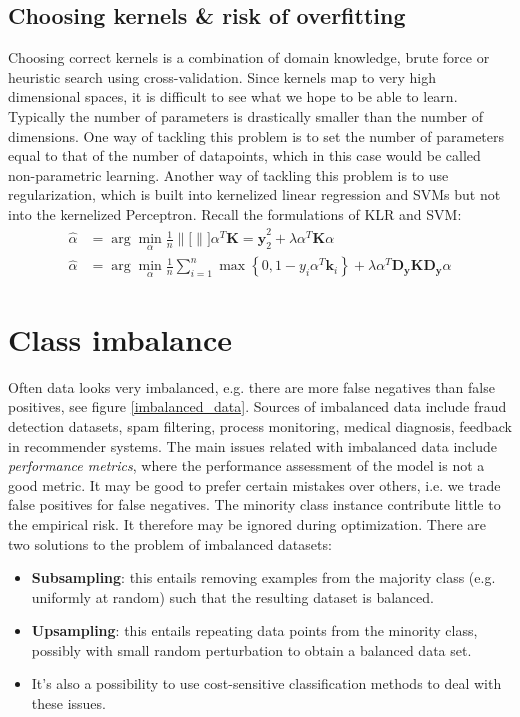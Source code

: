 \documentclass[a4paper,10pt,twoside]{article}
\newcommand\norm[1]{\left\lVert#1\right\rVert}
\begin{document}
\subsection{Choosing kernels \& risk of overfitting}

Choosing correct kernels is a combination of domain knowledge, brute force or heuristic search using cross-validation. Since kernels map to very high dimensional spaces, it is difficult to see what we hope to be able to learn. Typically the number of parameters is drastically smaller than the number of dimensions. One way of tackling this problem is to set the number of parameters equal to that of the number of datapoints, which in this case would be called non-parametric learning. Another way of tackling this problem is to use regularization, which is built into kernelized linear regression and SVMs but not into the kernelized Perceptron. Recall the formulations of KLR and SVM:
\begin{align*}
    \hat{\alpha} &= \arg\min_{\alpha}\frac{1}{n}\norm[]{\alpha^T\mathbf{K}=\mathbf{y}}_2^2+\lambda\alpha^T\mathbf{K}\alpha\\
    \hat{\alpha} &= \arg\min_{\alpha}\frac{1}{n}\sum_{i=1}^{n}\max\left\{0,1-y_i\alpha^T\mathbf{k}_i\right\} + \lambda\alpha^T\mathbf{D}_{\mathbf{y}}\mathbf{K}\mathbf{D}_\mathbf{y}\alpha
\end{align*}

\section{Class imbalance}

Often data looks very imbalanced, e.g. there are more false negatives than false positives, see figure \ref{imbalanced_data}. Sources of imbalanced data include fraud detection datasets, spam filtering, process monitoring, medical diagnosis, feedback in recommender systems. The main issues related with imbalanced data include \textit{performance metrics}, where the performance assessment of the model is not a good metric. It may be good to prefer certain mistakes over others, i.e. we trade false positives for false negatives. The minority class instance contribute little to the empirical risk. It therefore may be ignored during optimization. There are two solutions to the problem of imbalanced datasets:
\begin{itemize}
    \item \textbf{Subsampling}: this entails removing examples from the majority class (e.g. uniformly at random) such that the resulting dataset is balanced.
    \item \textbf{Upsampling}: this entails repeating data points from the minority class, possibly with small random perturbation to obtain a balanced data set.
    \item It's also a possibility to use cost-sensitive classification methods to deal with these issues.
\end{itemize}
\end{document}
